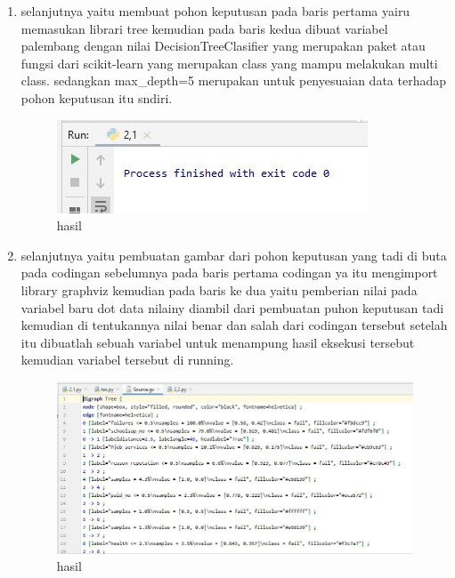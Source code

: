 \begin{enumerate}
\item selanjutnya yaitu membuat pohon keputusan pada baris pertama yairu memasukan librari tree kemudian pada baris kedua dibuat variabel palembang dengan nilai DecisionTreeClasifier yang merupakan paket atau fungsi dari scikit-learn yang merupakan class yang mampu melakukan multi class. sedangkan max\_depth=5 merupakan untuk penyesuaian data terhadap pohon keputusan itu sndiri.

\begin{figure}[ht]
\centering
\includegraphics[scale=0.5]{figures/1174042/chapter2/2,5.JPG}
\caption{hasil}
\label{contoh}
\end{figure}

\item selanjutnya yaitu pembuatan gambar dari pohon keputusan yang tadi di buta pada codingan sebelumnya pada baris pertama codingan ya itu mengimport library graphviz kemudian pada baris ke dua yaitu pemberian nilai pada variabel baru dot data nilainy diambil dari pembuatan puhon keputusan tadi kemudian di tentukannya nilai benar dan salah dari codingan tersebut setelah itu dibuatlah sebuah variabel untuk menampung hasil eksekusi tersebut kemudian variabel tersebut di running.

\begin{figure}[ht]
\centering
\includegraphics[scale=0.5]{figures/1174042/chapter2/2,6.JPG}
\caption{hasil}
\label{contoh}
\end{figure}


\end{enumerate}

